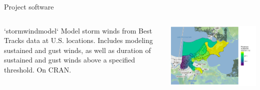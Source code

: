\documentclass[ignorenonframetext,]{beamer}
\begin{document}
\begin{frame}{Project software}

\begin{columns}
\begin{column}{0.3\textwidth}
\footnotesize
\begin{block}{`stormwindmodel`}
Model storm winds from Best Tracks data at U.S. locations. Includes modeling sustained and gust winds, as well as duration of sustained and gust winds above a specified threshold. On CRAN.
\end{block}
\end{column}
\begin{column}{0.7\textwidth}

\begin{center}\includegraphics[width=\textwidth]{census_track_modeled_winds} \end{center}
\end{column}
\end{columns}

\end{frame}
\end{document}
